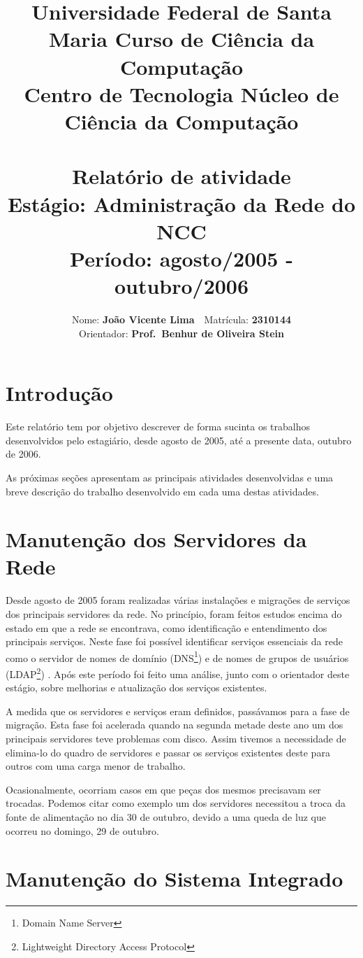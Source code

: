 \documentclass[a4paper,11pt]{article}
\title{
        {\small
        {Universidade Federal de Santa Maria} \hfill
        {Curso de Ciência da Computação} \\
        \vskip -4mm
        Centro de Tecnologia \hfill
        Núcleo de Ciência da Computação
        }\\~\\
        {Relatório de atividade}\\[4mm]
        {\large \sc Estágio: \textbf{Administração da Rede do NCC}}
        \\[4mm]
        {\large Período: \textbf{agosto/2005 - outubro/2006}}
}
\author{
        {Nome: \textbf{João Vicente Lima}}\ \
        {Matrícula: \textbf{2310144}}\\
        {Orientador: \textbf{Prof.\ Benhur de Oliveira Stein}}\\
}
\date{}
\begin{document}
\maketitle

\section{Introdução}

Este relatório tem por objetivo descrever de forma sucinta os trabalhos
desenvolvidos pelo estagiário, desde agosto de 2005, até a presente data,
outubro de 2006.

As próximas seções apresentam as principais atividades desenvolvidas e uma
breve descrição do trabalho desenvolvido em cada uma destas atividades.

\section{Manutenção dos Servidores da Rede}

Desde agosto de 2005 foram realizadas várias instalações e migrações
de serviços dos principais servidores da rede. No princípio, foram
feitos estudos encima do estado em que a rede se encontrava,
como identificação e entendimento dos principais serviços. Neste fase
foi possível identificar serviços essenciais da rede como o servidor
de nomes de domínio (DNS\footnote{Domain Name Server})
\cite{dnsr,dnshowto,dnsstuff,iscbind} e de nomes de grupos de
usuários (LDAP\footnote{Lightweight Directory Access Protocol})
\cite {openldap,ldapbrasil}.
Após este
período foi feito uma análise, junto com o orientador deste estágio, sobre
melhorias e atualização dos serviços existentes.

A medida que os servidores e serviços eram definidos, passávamos para
a fase de migração. Esta fase foi acelerada quando na segunda metade
deste ano um dos principais servidores teve problemas com disco. Assim
tivemos a necessidade de elimina-lo do quadro de servidores e passar
os serviços existentes deste para outros com uma carga menor de
trabalho.

Ocasionalmente, ocorriam casos em que peças dos mesmos precisavam ser
trocadas. Podemos citar como exemplo um dos servidores necessitou a
troca da fonte de alimentação no dia 30 de outubro,
devido a uma queda de luz que ocorreu no domingo, 29 de outubro.

\section{Manutenção do Sistema Integrado}
\end{document}
